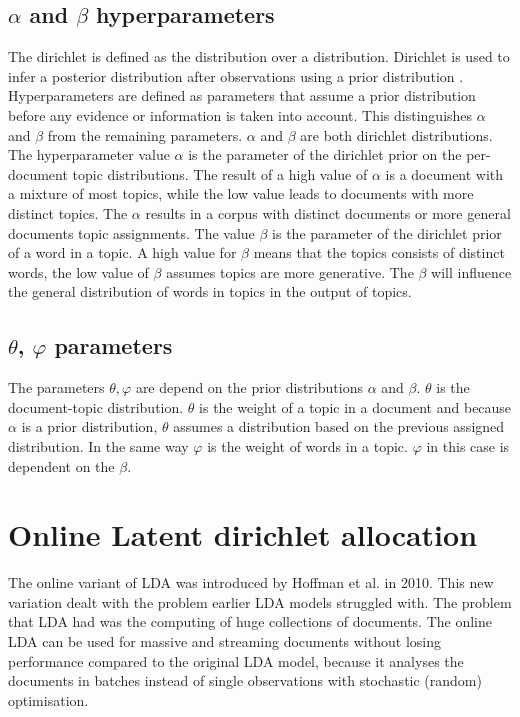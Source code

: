 \subsection{$\alpha$ and $\beta$ hyperparameters}  \label{lda:alphabeta}
The dirichlet is defined as the distribution over a distribution. Dirichlet is used to infer a posterior distribution after observations using a prior distribution \cite{Sethuraman2001APRIORS}. Hyperparameters are defined as parameters that assume a prior distribution before any evidence or information is taken into account. This distinguishes $\alpha$ and $\beta$ from the remaining parameters. $\alpha$ and $\beta$ are both dirichlet distributions. The hyperparameter value $\alpha$ is the parameter of the dirichlet prior on the per-document topic distributions. The result of a high value of $\alpha$ is a document with a mixture of most topics, while the low value leads to documents with more distinct topics. The $\alpha$ results in a corpus with distinct documents or more general documents topic assignments. The value $\beta$ is the parameter of the dirichlet prior of a word in a topic. A high value for $\beta$ means that the topics consists of distinct words, the low value of $\beta$ assumes topics are more generative. The $\beta$ will influence the general distribution of words in topics in the output of topics.

\subsection{$\theta$, $\varphi$ parameters}\label{lda:thetavarphi}
The parameters $\theta, \varphi$ are depend on the prior distributions $\alpha$ and $\beta$. $\theta$ is the document-topic distribution. $\theta$ is the weight of a topic in a document and because $\alpha$ is a prior distribution, $\theta$ assumes a distribution based on the previous assigned distribution. 
In the same way $\varphi$ is the weight of words in a topic. $\varphi$ in this case is dependent on the $\beta$.

\section{Online Latent dirichlet allocation} \label{lda:onlinelda}
The online variant of LDA was introduced  by Hoffman et al. in 2010.\cite{Hoffman2010OnlineAllocation} This new variation dealt with the problem earlier LDA models struggled with. The problem that LDA had was the computing of huge collections of documents. The online LDA can be used for massive and streaming documents without losing performance compared to the original LDA model, because it analyses the documents in batches instead of single observations with stochastic (random) optimisation.\cite{Beaver2012StochasticInference} 
